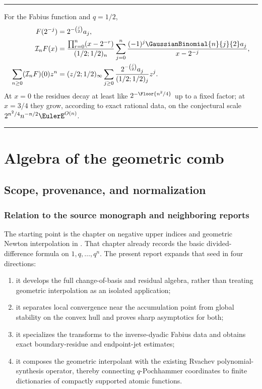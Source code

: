 \documentclass[11pt,oneside]{book}
\numberwithin{equation}{chapter}
\theoremstyle{definition}
\theoremstyle{remark}
\newcommand{\twobinom}[2]{\GaussianBinomial{#1}{#2}{2}}
\newcommand{\Interp}{\mathcal I}
\newenvironment{resultbox}
{\par\medskip\noindent\begin{center}\begin{minipage}{0.94\textwidth}\hrule\medskip}
{\medskip\hrule\end{minipage}\end{center}\medskip}
\begin{document}
\begin{resultbox}
For the Fabius function and $q=1/2$,
\begin{align*}
 F(2^{-j})&=2^{-\binom j2}a_j,\\
 \Interp_nF(x)
 &=\frac{\prod_{r=0}^n(x-2^{-r})}{(1/2;1/2)_n}
   \sum_{j=0}^n
   \frac{(-1)^j\twobinom{n}{j}a_j}{x-2^{-j}},\\
 \sum_{n\ge0}(\Interp_nF)(0)z^n
 &=(z/2;1/2)_\infty
   \sum_{j\ge0}\frac{2^{-\binom j2}a_j}{(1/2;1/2)_j}z^j.
\end{align*}
At $x=0$ the residues decay at least like
$2^{-\Floor{n^2/4}}$ up to a fixed factor; at $x=3/4$ they grow, according
to exact rational data, on the conjectural scale
$2^{n^2/4}n^{-n/2}\EulerE^{O(n)}$.
\end{resultbox}

\tableofcontents
\mainmatter

\part{Algebra of the geometric comb}

\chapter{Scope, provenance, and normalization}
\label{chap:scope}

\section{Relation to the source monograph and neighboring reports}

The starting point is the chapter on negative upper indices and geometric
Newton interpolation in
.  That chapter already records
the basic divided-difference formula on $1,q,\ldots,q^n$.  The present report
expands that seed in four directions:

\begin{enumerate}
\item it develops the full change-of-basis and residual algebra, rather than
      treating geometric interpolation as an isolated application;
\item it separates local convergence near the accumulation point from global
      stability on the convex hull and proves sharp asymptotics for both;
\item it specializes the transforms to the inverse-dyadic Fabius data and
      obtains exact boundary-residue and endpoint-jet estimates;
\item it composes the geometric interpolant with the existing Rvachev
      polynomial-synthesis operator, thereby connecting $q$-Pochhammer
      coordinates to finite dictionaries of compactly supported atomic
      functions.
\end{enumerate}
\end{document}
